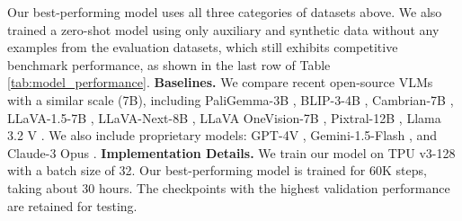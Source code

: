 \noindent Our best-performing model uses all three categories of datasets above. We also trained a zero-shot model using only auxiliary and synthetic data without any examples from the evaluation datasets, which still exhibits competitive benchmark performance, as shown in the last row of Table \ref{tab:model_performance}.
\smallbreak
\noindent \textbf{Baselines.} We compare recent open-source VLMs with a similar scale (7B), including PaliGemma-3B \cite{beyer2024paligemma}, BLIP-3-4B \cite{xue2024xgen}, Cambrian-7B \cite{tong2024cambrian}, LLaVA-1.5-7B \cite{liu2023llava}, LLaVA-Next-8B \cite{liu2024llavanext}, LLaVA OneVision-7B \cite{li2024llava}, Pixtral-12B \cite{agrawal2024pixtral}, Llama 3.2 V \cite{meta2024llama}.
We also include proprietary models: GPT-4V \cite{gpt4}, Gemini-1.5-Flash \cite{team2024gemini}, and Claude-3 Opus \cite{anthropic2024claude}.
\smallbreak
\noindent \textbf{Implementation Details.} We train our model on TPU v3-128 with a batch size of 32. Our best-performing model is trained for 60K steps, taking about 30 hours. The checkpoints with the highest validation performance are retained for testing.